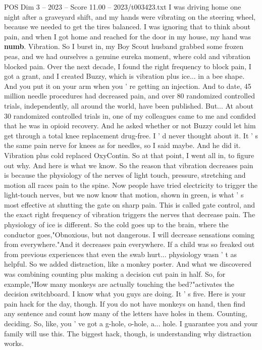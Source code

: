 \begin{textsample}{POS Dim 3 – 2023 – Score 11.00 – 2023/t003423.txt}
I was driving home one night after a graveyard shift, and my hands were vibrating on the steering wheel, because we needed to get the tires balanced.
I was ignoring that to think about pain, and when I got home and reached for the door in my house, my hand was \textbf{numb}.
Vibration.
So I burst in, my Boy Scout husband grabbed some frozen peas, and we had ourselves a genuine eureka moment, where cold and vibration blocked pain.
Over the next decade, I found the right frequency to block pain, I got a grant, and I created Buzzy, which is vibration plus ice... in a bee shape.
And you put it on your arm when you ' re getting an injection.
And to date, 45 million needle procedures had decreased pain, and over 80 randomized controlled trials, independently, all around the world, have been published.
But...
At about 30 randomized controlled trials in, one of my colleagues came to me and confided that he was in opioid recovery.
And he asked whether or not Buzzy could let him get through a total knee replacement drug-free.
I ' d never thought about it.
It ' s the same pain nerve for knees as for needles, so I said maybe.
And he did it.
Vibration plus cold replaced OxyContin.
So at that point, I went all in, to figure out why.
And here is what we know.
So the reason that vibration decreases pain is because the physiology of the nerves of light touch, pressure, stretching and motion all races pain to the spine.
Now people have tried electricity to trigger the light-touch nerves, but we now know that motion, shown in green, is what ' s most effective at shutting the gate on sharp pain.
This is called gate control, and the exact right frequency of vibration triggers the nerves that decrease pain.
The physiology of ice is different.
So the cold goes up to the brain, where the conductor goes,"Obnoxious, but not dangerous.
I will decrease sensations coming from everywhere."And it decreases pain everywhere.
If a child was so freaked out from previous experiences that even the swab hurt... physiology wasn ' t as helpful.
So we added distraction, like a monkey poster.
And what we discovered was combining counting plus making a decision cut pain in half.
So, for example,"How many monkeys are actually touching the bed?"activates the decision switchboard.
I know what you guys are doing.
It ' s five.
Here is your pain hack for the day, though.
If you do not have monkeys on hand, then find any sentence and count how many of the letters have holes in them.
Counting, deciding.
So, like, you ' ve got a g-hole, o-hole, a... hole.
I guarantee you and your family will use this.
The biggest hack, though, is understanding why distraction works.

\end{textsample}
